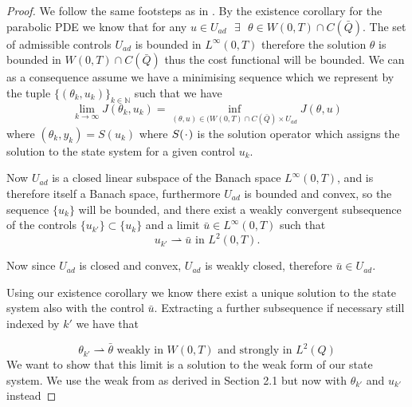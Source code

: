 \begin{proof}
We follow the same footsteps as in  \cite{DPSteel}. By the existence corollary for the parabolic PDE we know that  for any $u \in U_{ad} \text{ } \exists \text{ }\theta \in W(0,T)\cap C(\bar{Q})$. The set of admissible controls $U_{ad}$ is bounded in $L^{\infty}(0,T)$ therefore the solution $\theta$ is bounded in $W(0,T) \cap C(\bar{Q})$ thus the cost functional will be bounded. We can as a consequence assume we have a minimising sequence which we represent by the tuple $\{(\theta_k,u_k)\}_{k\in \mathbb{N}}$ such that we have 
\begin{equation*}
    \lim_{k\rightarrow \infty}J(\theta_k,u_k) = \inf_{(\theta,u)\in (W(0,T) \cap C(\bar{Q})\times U_{ad}}J(\theta,u)
\end{equation*}
where $(\theta_k,y_k) = S(u_k)$ where $S(\placeholder)$ is the solution operator which assigns the solution to the state system for a given control $u_k$.

Now $U_{ad}$ is a closed linear subspace of the Banach space $L^{\infty}(0,T)$, and is therefore itself a  Banach space, furthermore $U_{ad}$ is bounded and convex, so the sequence $\{u_k\}$ will be bounded, and there exist a weakly convergent subsequence of the controls $\{u_{k'} \} \subset \{u_k \}$ and a limit $\bar{u} \in L^{\infty}(0,T)$ such that
\begin{equation*}
    u_{k'} \rightharpoonup \bar{u} \text{ in } L^2(0,T).
\end{equation*}

Now since $U_{ad}$ is closed and convex, $U_{ad}$ is weakly closed, therefore $\bar{u} \in U_{ad}$. \bigskip

Using our existence corollary we know there exist a unique solution to the state system also with the control $\bar{u}$. Extracting a further subsequence if necessary still indexed by $k'$ we have that 

\begin{equation*}
    \theta_{k'} \rightharpoonup \bar{\theta} \text{ weakly in } W(0,T) \text{ and strongly in } L^2(Q)
\end{equation*}
We want to show that this limit is a solution to the weak form of our state system. We use the weak from as derived in Section 2.1 but now with $\theta_{k'}$ and $u_{k'}$ instead 


\end{proof}
